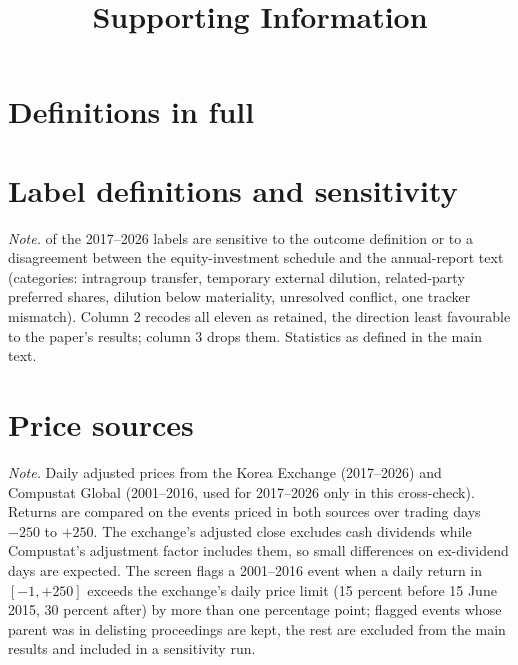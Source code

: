 \documentclass[12pt]{article}
\title{Supporting Information}\author{}\date{}
\newcommand{\tabnote}[1]{\par\vspace{4pt}\begin{minipage}{\linewidth}\singlespacing\small\emph{Note.} #1\end{minipage}}
\begin{document}
\maketitle
\section{Definitions in full}
{\footnotesize}
\section{Label definitions and sensitivity}
\begin{table}[htbp]\centering\caption{Headline results with the \NSensitive{} definition-sensitive labels flipped or dropped}\label{tab:s_labels}
{\footnotesize\setlength{\tabcolsep}{3pt}}\tabnote{\NSensitive{} of the 2017--2026 labels are sensitive to the outcome definition or to a disagreement between the equity-investment schedule and the annual-report text (categories: intragroup transfer, temporary external dilution, related-party preferred shares, dilution below materiality, unresolved conflict, one tracker mismatch). Column 2 recodes all eleven as retained, the direction least favourable to the paper's results; column 3 drops them. Statistics as defined in the main text.}\end{table}
\section{Price sources}
\begin{table}[htbp]\centering\caption{Two price sources: cross-check and screen}\label{tab:s_prices}
{\footnotesize\setlength{\tabcolsep}{3pt}}\tabnote{Daily adjusted prices from the Korea Exchange (2017--2026) and Compustat Global (2001--2016, used for 2017--2026 only in this cross-check). Returns are compared on the events priced in both sources over trading days $-250$ to $+250$. The exchange's adjusted close excludes cash dividends while Compustat's adjustment factor includes them, so small differences on ex-dividend days are expected. The screen flags a 2001--2016 event when a daily return in $[-1, +250]$ exceeds the exchange's daily price limit (15 percent before 15 June 2015, 30 percent after) by more than one percentage point; flagged events whose parent was in delisting proceedings are kept, the rest are excluded from the main results and included in a sensitivity run.}\end{table}
\end{document}

